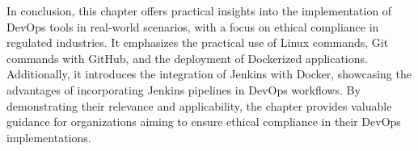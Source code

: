 In conclusion, this chapter offers practical insights into the implementation of DevOps tools in real-world scenarios, with a focus on ethical compliance in regulated industries. It emphasizes the practical use of Linux commands, Git commands with GitHub, and the deployment of Dockerized applications. Additionally, it introduces the integration of Jenkins with Docker, showcasing the advantages of incorporating Jenkins pipelines in DevOps workflows. By demonstrating their relevance and applicability, the chapter provides valuable guidance for organizations aiming to ensure ethical compliance in their DevOps implementations.







